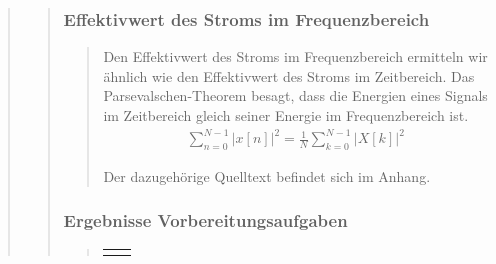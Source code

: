 \begin{quote}
\begin{quote}
        \subsubsection{Effektivwert des Stroms im Frequenzbereich}
        \begin{quote}
            Den Effektivwert des Stroms im Frequenzbereich ermitteln wir ähnlich wie den Effektivwert des Stroms im
            Zeitbereich. Das Parsevalschen-Theorem besagt, dass die Energien eines Signals im Zeitbereich gleich seiner
            Energie im Frequenzbereich ist.\cite{PasevalscheTheorem}\\
            \begin{equation*}
            	\begin{split}
            		\sum_{n=0}^{N-1} |x[n]|^2 = \frac{1}{N} \sum_{k=0}^{N-1} |X[k]|^2
            	\end{split}
            \end{equation*}
            
            Der dazugehörige Quelltext befindet sich im Anhang.
            \end{quote}
        \subsubsection{Ergebnisse Vorbereitungsaufgaben}
        \begin{quote}
                \begin{center}
                \begin{tabular}{ll}
    
                \hspace{-11em}
                    \begin{minipage}{0.6\textwidth}
    

\end{minipage}
\end{tabular}
\end{center}
\end{quote}
\end{quote}
\end{quote}
